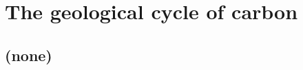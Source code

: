 
\cleardoublepage


\chapter{The geological cycle of carbon}\label{ch:geological-carbon}

\hfill \break

\newpage

\section{(none)}

